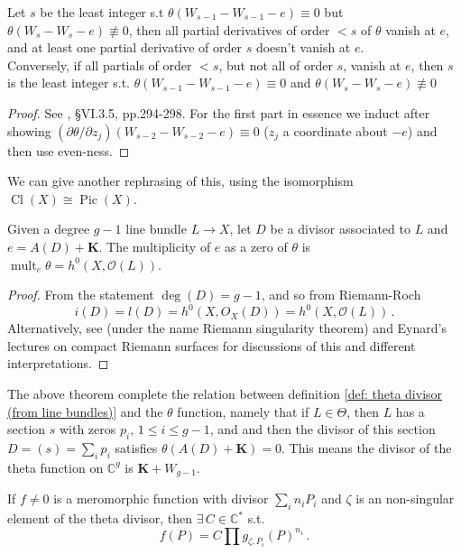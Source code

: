\documentclass{article}
\begin{document}
\begin{theorem}
	Let $s$ be the least integer s.t $\theta(W_{s-1} - W_{s-1} - e) \equiv 0$ but $\theta(W_s - W_s-e) \not\equiv 0$, then all partial derivatives of order $< s$ of $\theta$ vanish at $e$, and at least one partial derivative of order $s$ doesn't vanish at $e$. \\
	Conversely, if all partials of order $<s$, but not all of order $s$, vanish at $e$, then $s$ is the least integer s.t. $\theta(W_{s-1} - W_{s-1} - e) \equiv 0$ and $\theta(W_s - W_s-e) \not\equiv 0$
\end{theorem}
\begin{proof}
	See \cite{Farkas1992}, \S VI.3.5, pp.294-298. For the first part in essence we induct after showing $(\partial \theta/\partial z_j)(W_{s-2}-W_{s-2}-e) \equiv 0$ ($z_j$ a coordinate about $-e$) and then use even-ness. 
\end{proof}

We can give another rephrasing of this, using the isomorphism $\operatorname{Cl}(X) \cong \operatorname{Pic}(X)$. 
\begin{theorem}\label{thm: RVT in Braden2006}
	Given a degree $g-1$ line bundle $L \to X$, let $D$ be a divisor associated to $L$ and $e = A(D) + \bm{K}$. The multiplicity of $e$ as a zero of $\theta$ is $\operatorname{mult}_e \theta = h^0(X,\mathcal{O}(L))$.
\end{theorem}
\begin{proof}
	From the statement $\deg(D)=g-1$, and so from Riemann-Roch 
	\[
	i(D) = l(D) = h^0(X,O_X(D)) = h^0(X,\mathcal{O}(L)) \, .
	\] 
	Alternatively, see \cite{Griffiths1985} (under the name Riemann singularity theorem) and Eynard's lectures on compact Riemann surfaces for discussions of this and different interpretations.
\end{proof}
\begin{remark}
	The above theorem complete the relation between definition \ref{def: theta divisor (from line bundles)} and the $\theta$ function, namely that if $L \in \Theta$, then $L$ has a section $s$ with zeros $p_i, \, 1 \leq i \leq g-1$, and and then the divisor of this section $D = (s) = \sum_i p_i$ satisfies $\theta(A(D)+\bm{K})=0$. This means the divisor of the theta function on $\mathbb{C}^g$ is $\bm{K}+W_{g-1}$. 
\end{remark}
\begin{prop}
If $f \neq 0$ is a meromorphic function with divisor $\sum_i n_i P_i$ and $\zeta$ is an non-singular element of the theta divisor, then $\exists \, C \in \mathbb{C}^\ast$ s.t. 
\[
f(P)= C \prod g_{\zeta, P_i}(P)^{n_i} \, . 
\]
\end{prop}
\end{document}
